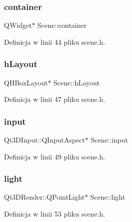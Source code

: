 \mbox{\label{class_scene_a10832d33619bdb86c51bb75377ea649d}} 
\subsubsection{\texorpdfstring{container}{container}}
{\footnotesize\ttfamily Q\+Widget$\ast$ Scene\+::container}



Definicja w linii 44 pliku scene.\+h.

\mbox{\label{class_scene_a285ea7ad07d9419d79fccbde3a9f8388}} 
\subsubsection{\texorpdfstring{h\+Layout}{hLayout}}
{\footnotesize\ttfamily Q\+H\+Box\+Layout$\ast$ Scene\+::h\+Layout}



Definicja w linii 47 pliku scene.\+h.

\mbox{\label{class_scene_aa17e5d3b3393d6ea4cbbf7ab981b5b62}} 
\subsubsection{\texorpdfstring{input}{input}}
{\footnotesize\ttfamily Qt3\+D\+Input\+::\+Q\+Input\+Aspect$\ast$ Scene\+::input}



Definicja w linii 49 pliku scene.\+h.

\mbox{\label{class_scene_ac2f294ceccf5b708d6dcdd540e51d787}} 
\subsubsection{\texorpdfstring{light}{light}}
{\footnotesize\ttfamily Qt3\+D\+Render\+::\+Q\+Point\+Light$\ast$ Scene\+::light}



Definicja w linii 53 pliku scene.\+h.

\mbox{\label{class_scene_a7a9feb72cc710357f6166f5ec45369cd}} 
